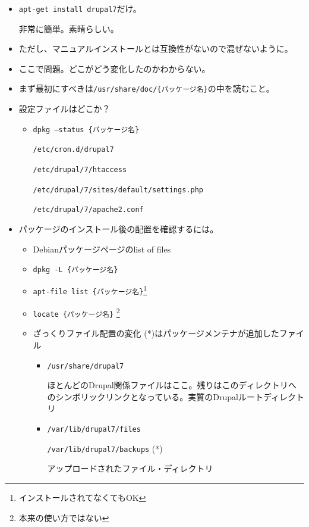 \documentclass[mingoth,a4paper]{jsarticle}
\begin{document}
\begin{itemize}
\item {\tt apt-get install drupal7}だけ。

非常に簡単。素晴らしい。
\item ただし、マニュアルインストールとは互換性がないので混ぜないように。\cite{ubuntudoc}
\item ここで問題。どこがどう変化したのかわからない。
\item まず最初にすべきは{\tt /usr/share/doc/\{パッケージ名\}}の中を読むこと。
\item 設定ファイルはどこか？
  \begin{itemize}
  \item {\tt dpkg --status \{パッケージ名\}}
    \begin{itemize}
      {\tt /etc/cron.d/drupal7}

      {\tt /etc/drupal/7/htaccess}

      {\tt /etc/drupal/7/sites/default/settings.php}

      {\tt /etc/drupal/7/apache2.conf}
    \end{itemize}
  \end{itemize}
\item パッケージのインストール後の配置を確認するには。
  \begin{itemize}
  \item Debianパッケージページのlist of files\cite{filelist}
  \item {\tt dpkg -L \{パッケージ名\}}
  \item {\tt apt-file list \{パッケージ名\}}\footnote{インストールされてなくてもOK}
  \item {\tt locate \{パッケージ名\}} \footnote{本来の使い方ではない}

\clearpage

  \item ざっくりファイル配置の変化 (*)はパッケージメンテナが追加したファイル
    \begin{itemize}
    \item {\tt /usr/share/drupal7}

      ほとんどのDrupal関係ファイルはここ。残りはこのディレクトリへのシンボリックリンクとなっている。実質のDrupalルートディレクトリ

    \item {\tt /var/lib/drupal7/files}

      {\tt /var/lib/drupal7/backups} (*)

      アップロードされたファイル・ディレクトリ


\end{itemize}
\end{itemize}
\end{itemize}
\end{document}
